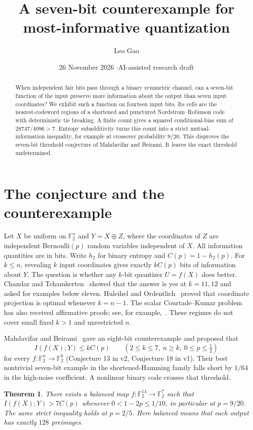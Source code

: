 \documentclass[11pt]{article}
\title{A seven-bit counterexample for most-informative quantization}
\author{Leo Gao}
\date{26 November 2026 \quad$\cdot$\quad AI-assisted research draft}
\newtheorem{theorem}{Theorem}
\newcommand{\F}{\mathbb F_2}
\begin{document}
\maketitle
\begin{abstract}
When independent fair bits pass through a binary symmetric channel, can a seven-bit function of the input preserve more information about the output than seven input coordinates? We exhibit such a function on fourteen input bits. Its cells are the nearest-codeword regions of a shortened and punctured Nordstrom--Robinson code with deterministic tie breaking. A finite count gives a squared conditional-bias sum of $28747/4096>7$. Entropy subadditivity turns this count into a strict mutual-information inequality, for example at crossover probability $9/20$. This disproves the seven-bit threshold conjecture of Mahdavifar and Beirami. It leaves the exact threshold undetermined.
\end{abstract}
\section{The conjecture and the counterexample}
Let $X$ be uniform on $\F^n$ and $Y=X\oplus Z$, where the coordinates of $Z$ are independent Bernoulli$(p)$ random variables independent of $X$. All information quantities are in bits. Write $h_2$ for binary entropy and $C(p)=1-h_2(p)$. For $k\le n$, revealing $k$ input coordinates gives exactly $kC(p)$ bits of information about $Y$.
The question is whether any $k$-bit quantizer $U=f(X)$ does better.
Chandar and Tchamkerten~\cite{ct} showed that the answer is yes at $k=11,12$ and asked for examples below eleven. Huleihel and Ordentlich~\cite{ho} proved that coordinate projection is optimal whenever $k=n-1$. The scalar Courtade--Kumar problem has also received affirmative proofs; see, for example,~\cite{cg}. These regimes do not cover small fixed $k>1$ and unrestricted $n$.

Mahdavifar and Beirami~\cite{mb} gave an eight-bit counterexample and proposed that
\[
 I(f(X);Y)\le kC(p)\qquad
 (2\le k\le7,\ n\ge k,\ 0\le p\le\tfrac12)
\]
for every $f:\F^n\to\F^k$ (Conjecture 13 in v2, Conjecture 18 in v1). Their best nontrivial seven-bit example in the shortened-Hamming family falls short by $1/64$ in the high-noise coefficient. A nonlinear binary code crosses that threshold.
\begin{theorem}\label{thm}
There exists a balanced map $f:\F^{14}\to\F^7$ such that
$I(f(X);Y)>7C(p)$ whenever $0<1-2p\le 1/10$, in particular at $p=9/20$. The same strict inequality holds at $p=2/5$. Here balanced means that each output has exactly $128$ preimages.
\end{theorem}
\end{document}
